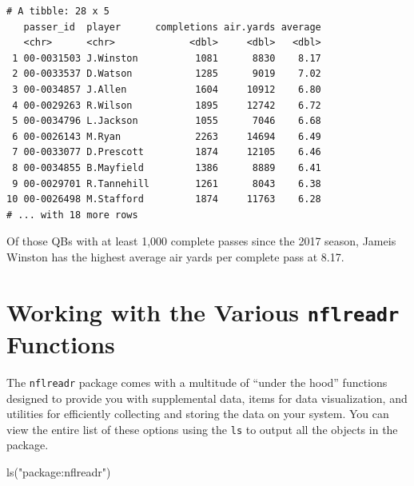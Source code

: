 \documentclass[
  letterpaper,
]{krantz}
\newenvironment{Shaded}{\begin{snugshade}}{\end{snugshade}}
\newcommand{\FunctionTok}[1]{\textcolor[rgb]{0.28,0.35,0.67}{#1}}
\newcommand{\NormalTok}[1]{\textcolor[rgb]{0.00,0.23,0.31}{#1}}
\newcommand{\StringTok}[1]{\textcolor[rgb]{0.13,0.47,0.30}{#1}}
\begin{document}
\begin{verbatim}
# A tibble: 28 x 5
   passer_id  player      completions air.yards average
   <chr>      <chr>             <dbl>     <dbl>   <dbl>
 1 00-0031503 J.Winston          1081      8830    8.17
 2 00-0033537 D.Watson           1285      9019    7.02
 3 00-0034857 J.Allen            1604     10912    6.80
 4 00-0029263 R.Wilson           1895     12742    6.72
 5 00-0034796 L.Jackson          1055      7046    6.68
 6 00-0026143 M.Ryan             2263     14694    6.49
 7 00-0033077 D.Prescott         1874     12105    6.46
 8 00-0034855 B.Mayfield         1386      8889    6.41
 9 00-0029701 R.Tannehill        1261      8043    6.38
10 00-0026498 M.Stafford         1874     11763    6.28
# ... with 18 more rows
\end{verbatim}

Of those QBs with at least 1,000 complete passes since the 2017 season,
Jameis Winston has the highest average air yards per complete pass at
8.17.

\hypertarget{working-with-the-various-nflreadr-functions}{%
\section{\texorpdfstring{Working with the Various \texttt{nflreadr}
Functions}{Working with the Various nflreadr Functions}}\label{working-with-the-various-nflreadr-functions}}

The \texttt{nflreadr} package comes with a multitude of ``under the
hood'' functions designed to provide you with supplemental data, items
for data visualization, and utilities for efficiently collecting and
storing the data on your system. You can view the entire list of these
options using the \texttt{ls} to output all the objects in the package.

\begin{Shaded}
\begin{Highlighting}[]
\FunctionTok{ls}\NormalTok{(}\StringTok{"package:nflreadr"}\NormalTok{)}
\end{Highlighting}
\end{Shaded}
\end{document}
